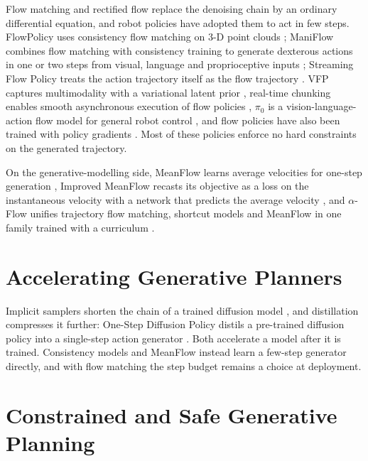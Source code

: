\documentclass[headsepline,footsepline,footinclude=false,oneside,fontsize=11pt,paper=a4,listof=totoc,bibliography=totoc]{scrbook}
\theoremstyle{definition}
\theoremstyle{plain}
\theoremstyle{remark}
\begin{document}
Flow matching \parencite{lipman2023flow,lipman2024guide} and rectified flow \parencite{liu2023flow}
replace the denoising chain by an ordinary differential equation, and robot policies have adopted them
to act in few steps. FlowPolicy uses consistency flow matching on 3-D point clouds
\parencite{zhang2024flowpolicy}; ManiFlow combines flow matching with consistency training to generate
dexterous actions in one or two steps from visual, language and proprioceptive inputs
\parencite{yan2025maniflow}; Streaming Flow Policy treats the action trajectory itself as the flow
trajectory \parencite{jiang2025streaming}. VFP captures multimodality with a variational latent prior
\parencite{zhai2025vfp}, real-time chunking enables smooth asynchronous execution of flow policies
\parencite{black2025rtc}, $\pi_0$ is a vision-language-action flow model for general robot control
\parencite{black2024pi0}, and flow policies have also been trained with policy gradients
\parencite{yi2026fpg}. Most of these policies enforce no hard constraints on the generated
trajectory.

On the generative-modelling side, MeanFlow learns average velocities for one-step generation
\parencite{geng2025meanflow}, Improved MeanFlow recasts its objective as a loss on the instantaneous
velocity with a network that predicts the average velocity \parencite{geng2025imf}, and $\alpha$-Flow
unifies trajectory flow matching, shortcut models and MeanFlow in one family trained with a curriculum
\parencite{zhang2025alphaflow}.

\section{Accelerating Generative Planners}\label{sec:rel:accel}

Implicit samplers shorten the chain of a trained diffusion model \parencite{song2021denoising}, and
distillation compresses it further: One-Step Diffusion Policy distils a pre-trained diffusion policy
into a single-step action generator \parencite{wang2024onedp}. Both accelerate a model after it is
trained. Consistency models \parencite{song2023consistency} and MeanFlow \parencite{geng2025meanflow}
instead learn a few-step generator directly, and with flow matching the step budget remains a choice at
deployment.

\section{Constrained and Safe Generative Planning}\label{sec:rel:safety}
\end{document}
